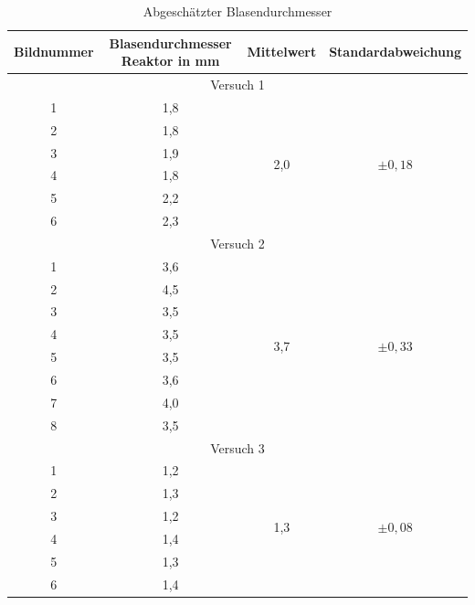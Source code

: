 \documentclass[12pt,liststotoc]{report}
\begin{document}
\begin{table}[H]
	\centering
	\caption{Abgeschätzter Blasendurchmesser}
	\begin{tabular}{cccc}
		\toprule
		Bildnummer & Blasendurchmesser Reaktor in mm& Mittelwert & Standardabweichung \\
		\midrule
		\multicolumn{4}{c}{Versuch 1}\\
		\midrule
		1&1,8&\multirow{6}{*}{2,0}&\multirow{6}{*}{$\pm 0,18$}\\
		2&1,8&&\\
		3&1,9&&\\
		4&1,8&&\\
		5&2,2&&\\
		6&2,3&&\\
		\midrule
		\multicolumn{4}{c}{Versuch 2}\\
		\midrule
		1&3,6&\multirow{8}{*}{3,7}&\multirow{8}{*}{$\pm 0,33$}\\
		2&4,5&&\\
		3&3,5&&\\
		4&3,5&&\\
		5&3,5&&\\
		6&3,6&&\\
		7&4,0&&\\
		8&3,5&&\\
		\midrule
		\multicolumn{4}{c}{Versuch 3}\\
		\midrule
		1&1,2&\multirow{6}{*}{1,3}&\multirow{6}{*}{$\pm 0,08$}\\
		2&1,3&&\\
		3&1,2&&\\
		4&1,4&&\\
		5&1,3&&\\
		6&1,4&&\\   
		\bottomrule
	\end{tabular}
	\label{tab:Blasendurchmesser}
\end{table}

 \newpage
 \newpage
 \newpage
 \newpage
 \newpage
 \newpage


\end{document}
